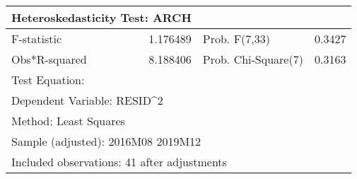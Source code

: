 
\begin{tabular}{lrrrr}
\toprule
\multicolumn{2}{l}{Heteroskedasticity Test: ARCH}&\multicolumn{1}{c}{}&\multicolumn{1}{c}{}&\multicolumn{1}{c}{}\\
\midrule
\multicolumn{1}{l}{F-statistic}&\multicolumn{1}{r}{1.176489}&\multicolumn{2}{l}{Prob. F(7,33)}&\multicolumn{1}{r}{0.3427}\\
\multicolumn{1}{l}{Obs*R-squared}&\multicolumn{1}{r}{8.188406}&\multicolumn{2}{l}{Prob. Chi-Square(7)}&\multicolumn{1}{r}{0.3163}\\
\midrule
\multicolumn{1}{l}{Test Equation:}&\multicolumn{1}{c}{}&\multicolumn{1}{c}{}&\multicolumn{1}{c}{}&\multicolumn{1}{c}{}\\
\multicolumn{2}{l}{Dependent Variable: RESID\textasciicircum 2}&\multicolumn{1}{c}{}&\multicolumn{1}{c}{}&\multicolumn{1}{c}{}\\
\multicolumn{2}{l}{Method: Least Squares}&\multicolumn{1}{c}{}&\multicolumn{1}{c}{}&\multicolumn{1}{c}{}\\
\multicolumn{3}{l}{Sample (adjusted): 2016M08 2019M12}&\multicolumn{1}{c}{}&\multicolumn{1}{c}{}\\
\multicolumn{4}{l}{Included observations: 41 after adjustments}&\multicolumn{1}{c}{}\\
\bottomrule
\end{tabular}
